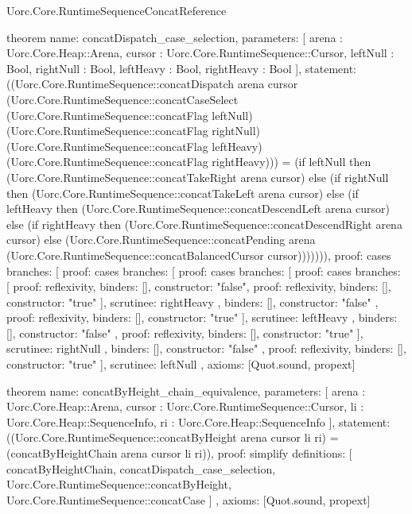 \begin{lexlean}{Uorc.Core.RuntimeSequenceConcatReference}
\begin{semanticmodule}
theorem{
  name: concatDispatch_case_selection,
  parameters: [
    arena : Uorc.Core.Heap::Arena,
    cursor : Uorc.Core.RuntimeSequence::Cursor,
    leftNull : Bool,
    rightNull : Bool,
    leftHeavy : Bool,
    rightHeavy : Bool
  ],
  statement: ((Uorc.Core.RuntimeSequence::concatDispatch arena cursor (Uorc.Core.RuntimeSequence::concatCaseSelect (Uorc.Core.RuntimeSequence::concatFlag leftNull) (Uorc.Core.RuntimeSequence::concatFlag rightNull) (Uorc.Core.RuntimeSequence::concatFlag leftHeavy) (Uorc.Core.RuntimeSequence::concatFlag rightHeavy))) = (if leftNull then (Uorc.Core.RuntimeSequence::concatTakeRight arena cursor) else (if rightNull then (Uorc.Core.RuntimeSequence::concatTakeLeft arena cursor) else (if leftHeavy then (Uorc.Core.RuntimeSequence::concatDescendLeft arena cursor) else (if rightHeavy then (Uorc.Core.RuntimeSequence::concatDescendRight arena cursor) else (Uorc.Core.RuntimeSequence::concatPending arena (Uorc.Core.RuntimeSequence::concatBalancedCursor cursor))))))),
  proof: cases{
    branches: [
      {
        proof: cases{
          branches: [
            {
              proof: cases{
                branches: [
                  {
                    proof: cases{
                      branches: [
                        {proof: reflexivity{}, binders: [], constructor: "false"},
                        {proof: reflexivity{}, binders: [], constructor: "true"}
                      ],
                      scrutinee: rightHeavy
                    },
                    binders: [],
                    constructor: "false"
                  },
                  {proof: reflexivity{}, binders: [], constructor: "true"}
                ],
                scrutinee: leftHeavy
              },
              binders: [],
              constructor: "false"
            },
            {proof: reflexivity{}, binders: [], constructor: "true"}
          ],
          scrutinee: rightNull
        },
        binders: [],
        constructor: "false"
      },
      {proof: reflexivity{}, binders: [], constructor: "true"}
    ],
    scrutinee: leftNull
  },
  axioms: [Quot.sound, propext]
}

theorem{
  name: concatByHeight_chain_equivalence,
  parameters: [
    arena : Uorc.Core.Heap::Arena,
    cursor : Uorc.Core.RuntimeSequence::Cursor,
    li : Uorc.Core.Heap::SequenceInfo,
    ri : Uorc.Core.Heap::SequenceInfo
  ],
  statement: ((Uorc.Core.RuntimeSequence::concatByHeight arena cursor li ri) = (concatByHeightChain arena cursor li ri)),
  proof: simplify{
    definitions: [
      concatByHeightChain,
      concatDispatch_case_selection,
      Uorc.Core.RuntimeSequence::concatByHeight,
      Uorc.Core.RuntimeSequence::concatCase
    ]
  },
  axioms: [Quot.sound, propext]
}


\end{semanticmodule}
\end{lexlean}
